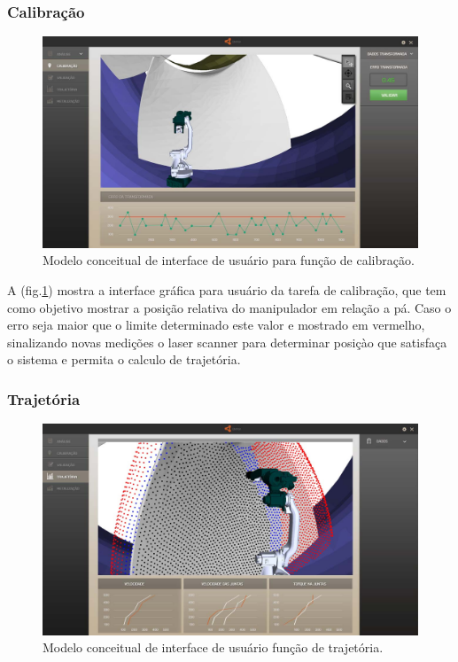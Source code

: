 \documentclass[12pt,a4paper]{article}
\begin{document}
\subsubsection {Calibração}

\begin{figure}[H]
\begin{center}
  \includegraphics[width=.95\columnwidth]{figs/Calibracao.jpg}
  \caption{Modelo conceitual de interface de usuário para função de calibração.}
  \label{fig:Interface_calibracao}
\end{center}
\end{figure} 

A (fig.\ref{fig:Interface_calibracao}) mostra a interface gráfica para usuário
da tarefa de calibração, que tem como objetivo mostrar a posição relativa do
manipulador em relação a pá. Caso o erro seja maior que o limite determinado
este valor e mostrado em vermelho, sinalizando novas medições o laser scanner
para determinar posiçào que satisfaça o sistema e permita o calculo de
trajetória.


\subsubsection {Trajetória}

\begin{figure}[H]
\begin{center}
  \includegraphics[width=\columnwidth]{figs/Trajetoria.jpg}
  \caption{Modelo conceitual de interface de usuário função de trajetória.}
  \label{fig:Interface_trajetoria}
\end{center}
\end{figure} 
\end{document}
